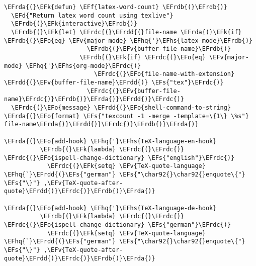 \documentclass[a4wide,10pt]{article}
\newcommand{\EFs}[1]{\textcolor{EFs}{#1}} %
\newcommand{\EFd}[1]{\textcolor{EFd}{#1}} %
\newcommand{\EFk}[1]{\textcolor{EFk}{#1}} %
\newcommand{\EFf}[1]{\textcolor{EFf}{#1}} %
\newcommand{\EFv}[1]{\textcolor{EFv}{#1}} %
\newcommand{\EFo}[1]{\textcolor{EFo}{#1}} %
\newcommand{\EFhq}[1]{\textcolor{EFhq}{#1}} %
\newcommand{\EFhs}[1]{\textcolor{EFhs}{#1}} %
\newcommand{\EFrda}[1]{\textcolor{EFrda}{#1}} %
\newcommand{\EFrdb}[1]{\textcolor{EFrdb}{#1}} %
\newcommand{\EFrdc}[1]{\textcolor{EFrdc}{#1}} %
\newcommand{\EFrdd}[1]{\textcolor{EFrdd}{#1}} %
\begin{document}
\begin{Code}
\begin{Verbatim}
\EFrda{(}\EFk{defun} \EFf{latex-word-count} \EFrdb{(}\EFrdb{)}
  \EFd{"Return latex word count using texlive"}
  \EFrdb{(}\EFk{interactive}\EFrdb{)}
  \EFrdb{(}\EFk{let} \EFrdc{(}\EFrdd{(}file-name \EFrda{(}\EFk{if} \EFrdb{(}\EFo{eq} \EFv{major-mode} \EFhq{'}\EFhs{latex-mode}\EFrdb{)}
                       \EFrdb{(}\EFv{buffer-file-name}\EFrdb{)}
                     \EFrdb{(}\EFk{if} \EFrdc{(}\EFo{eq} \EFv{major-mode} \EFhq{'}\EFhs{org-mode}\EFrdc{)}
                         \EFrdc{(}\EFo{file-name-with-extension} \EFrdd{(}\EFv{buffer-file-name}\EFrdd{)} \EFs{"tex"}\EFrdc{)}
                       \EFrdc{(}\EFv{buffer-file-name}\EFrdc{)}\EFrdb{)}\EFrda{)}\EFrdd{)}\EFrdc{)}
  \EFrdc{(}\EFo{message} \EFrdd{(}\EFo{shell-command-to-string} \EFrda{(}\EFo{format} \EFs{"texcount -1 -merge -template=\{1\} \%s"} file-name\EFrda{)}\EFrdd{)}\EFrdc{)}\EFrdb{)}\EFrda{)}

\EFrda{(}\EFo{add-hook} \EFhq{'}\EFhs{TeX-language-en-hook}
          \EFrdb{(}\EFk{lambda} \EFrdc{(}\EFrdc{)} \EFrdc{(}\EFo{ispell-change-dictionary} \EFs{"english"}\EFrdc{)}
            \EFrdc{(}\EFk{setq} \EFv{TeX-quote-language} \EFhq{`}\EFrdd{(}\EFs{"german"} \EFs{"\char92{}\char92{}enquote\{"} \EFs{"\}"} ,\EFv{TeX-quote-after-quote}\EFrdd{)}\EFrdc{)}\EFrdb{)}\EFrda{)}

\EFrda{(}\EFo{add-hook} \EFhq{'}\EFhs{TeX-language-de-hook}
          \EFrdb{(}\EFk{lambda} \EFrdc{(}\EFrdc{)} \EFrdc{(}\EFo{ispell-change-dictionary} \EFs{"german"}\EFrdc{)}
            \EFrdc{(}\EFk{setq} \EFv{TeX-quote-language} \EFhq{`}\EFrdd{(}\EFs{"german"} \EFs{"\char92{}\char92{}enquote\{"} \EFs{"\}"} ,\EFv{TeX-quote-after-quote}\EFrdd{)}\EFrdc{)}\EFrdb{)}\EFrda{)}



\end{Verbatim}
\end{Code}
\end{document}
